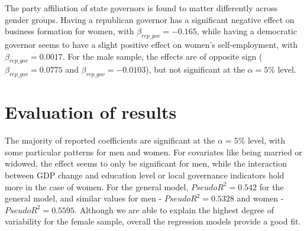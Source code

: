 The party affiliation of state governors is found to matter differently across gender groups. Having a republican governor has a significant negative effect on business formation for women, with $\beta_{rep\_gov} = -0.165$, while having a democratic governor seems to have a slight positive effect on women’s self-employment, with  $\beta_{rep\_gov} = 0.0017$. For the male sample, the effects are of opposite sign ($\beta_{rep\_gov} = 0.0775$ and $\beta_{rep\_gov} = -0.0103$), but not significant at the $\alpha = 5\% $ level. 

\section{Evaluation of results}

The majority of reported coefficients are significant at the $\alpha = 5\% $ level, with some particular patterns for men and women. For covariates like being married or widowed, the effect seems to only be significant for men, while the interaction between GDP change and education level or local governance indicators hold more in the case of women. For the general model, $PseudoR^2 = 0.542$ for the general model, and similar values for men - $PseudoR^2 = 0.5328$ and women - $PseudoR^2 = 0.5595$. Although we are able to explain the highest degree of variability for the female sample, overall the regression models provide a good fit.
























